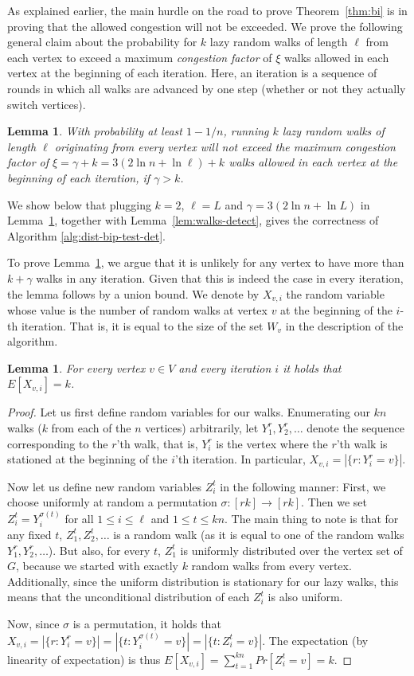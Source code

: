 \documentclass[11pt]{article}
\newtheorem{lemma}[theorem]{Lemma}
\begin{document}
As explained earlier, the main hurdle on the road to prove Theorem~\ref{thm:bi} is in proving that the allowed congestion will not be exceeded. We prove the following general claim about the probability for $k$ lazy random walks of length $\ell$ from each vertex to exceed a maximum \emph{congestion factor} of $\xi$ walks allowed in each vertex at the beginning of each iteration. Here, an iteration is a sequence of rounds in which all walks are advanced by one step (whether or not they actually switch vertices).
\begin{lemma}
\label{lemma:cong}
With probability at least $1-1/n$, running $k$ lazy random walks of length $\ell$ originating from
every vertex will not exceed the maximum \emph{congestion factor} of $\xi=\gamma+k=3(2\ln n + \ln
\ell)+k$ walks allowed in each vertex at the beginning of each iteration, if $\gamma > k$.
\end{lemma}
We show below that plugging $k=2$, $\ell=L$ and $\gamma=3(2\ln{n}+\ln{L})$ in Lemma~\ref{lemma:cong}, together with Lemma~\ref{lem:walks-detect}, gives the correctness of Algorithm \ref{alg:dist-bip-test-det}.

To prove Lemma~\ref{lemma:cong}, we argue that it is unlikely for any vertex to have more than $k+\gamma$ walks in any iteration. Given that this is indeed the case in every iteration, the lemma follows by a union bound. We denote by $X_{v,i}$ the random variable whose value is the number of random walks at vertex $v$ at the beginning of the $i$-th iteration. That is, it is equal to the size of the set $W_v$ in the description of the algorithm.

\begin{lemma}
\label{lem:exp-walks-in-vertex}
For every vertex $v\in V$ and every iteration $i$ it holds that $E[X_{v,i}] = k$.
\end{lemma}
\begin{proof}
Let us first define random variables for our walks.
Enumerating our $kn$ walks ($k$ from each of the $n$ vertices) arbitrarily, let $Y_1^r,Y_2^r,\ldots$ denote the sequence corresponding to the $r$'th walk, that is, $Y_i^r$ is the vertex where the $r$'th walk is stationed at the beginning of the $i$'th iteration. In particular, $X_{v,i}=|\{r:Y_i^r=v\}|$.

Now let us define new random variables $Z_i^t$ in the following manner: First, we choose uniformly at random a permutation $\sigma:[rk]\to [rk]$. Then we set $Z_i^t=Y_i^{\sigma(t)}$ for all $1\leq i\leq\ell$ and $1\leq t\leq kn$. The main thing to note is that for any fixed $t$, $Z_1^t,Z_2^t,\ldots$ is a random walk (as it is equal to one of the random walks $Y_1^r,Y_2^r,\ldots$). But also, for every $t$, $Z_1^t$ is uniformly distributed over the vertex set of $G$, because we started with exactly $k$ random walks from every vertex. Additionally, since the uniform distribution is stationary for our lazy walks, this means that the unconditional distribution of each $Z_i^t$ is also uniform.

Now, since $\sigma$ is a permutation, it holds that $X_{v,i}=|\{r:Y_i^r=v\}|=|\{t:Y_i^{\sigma(t)}=v\}|=|\{t:Z_i^t=v\}|$. The expectation (by linearity of expectation) is thus $E[X_{v,i}]=\sum_{t=1}^{kn}Pr[Z_i^t=v]=k$.
\end{proof}
\end{document}

